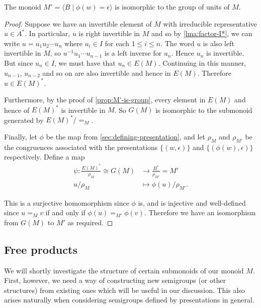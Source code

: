 \documentclass[noindex,noinsetproof,emphthm,12pt]{lmaths}
\begin{document}
\begin{theorem} \label{thm:Mdash-is-group-of-units}
	The monoid $M' = \langle B \mid \phi(w) = \epsilon \rangle$ is isomorphic to the group of units of $M$.
\end{theorem}
\begin{proof}
	Suppose we have an invertible element of $M$ with irreducible representative $u \in A^*$. In particular, $u$ is right invertible in $M$ and so by \cref{lma:factor-I*}, we can write $u = u_1u_2\cdots u_n$ where $u_i \in I$ for each $1 \le i \le n$. The word $u$ is also left invertible in $M$, so $u^{-1}u_1\cdots u_{n-1}$ is a left inverse for $u_n$.
	Hence $u_n$ is invertible. But since $u_n \in I$, we must have that $u_n \in E(M)$. Continuing in this manner, $u_{n-1}$, $u_{n-2}$ and so on are also invertible and hence in $E(M)$. Therefore $u \in E(M)^*$.

	Furthermore, by the proof of \cref{prop:M'-is-group}, every element in $E(M)$ and hence of $E(M)^*$ is invertible in $M$. So $G(M)$ is isomorphic to the submonoid generated by $E(M)^*/{=_M}$.

	Finally, let $\phi$ be the map from \cref{sec:defining-presentation}, and let $\rho_M$ and $\rho_{M'}$ be the congruences associated with the presentations $\{(w, \epsilon)\}$ and $\{(\phi(w), \epsilon)\}$ respectively. Define a map
	\begin{align*}
		\psi : \frac{E(M)^*}{\rho_M} \cong G(M) &\to \frac{B^*}{\rho_{M'}} = M' \\
		u/\rho_M &\mapsto \phi(u)/\rho_{M'}.
	\end{align*}

	This is a surjective homomorphism since $\phi$ is, and is injective and well-defined since $u =_M v$ if and only if $\phi(u) =_{M'} \phi(v)$. Therefore we have an isomorphism from $G(M)$ to $M'$ as required.
\end{proof}


\subsection{Free products}

We will shortly investigate the structure of certain submonoids of our monoid $M$. First, however, we need a way of constructing new semigroups (or other structures) from existing ones which will be useful in our discussion. This  also arises naturally when considering semigroups defined by presentations in general.
\end{document}
